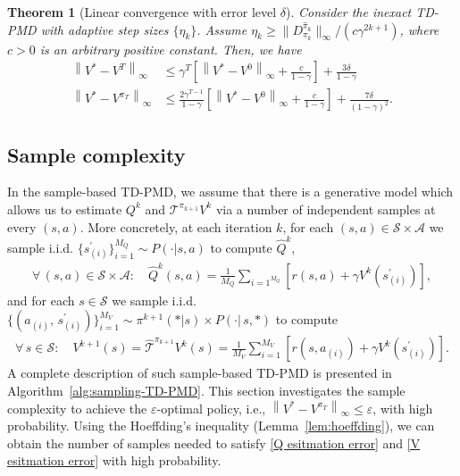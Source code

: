 \documentclass[10pt]{article}
\newcommand{\calA}{\mathcal{A}}
\newcommand{\calS}{\mathcal{S}}
\newcommand{\calT}{\mathcal{T}}
\newcommand{\ls}{\left}
\newcommand{\rs}{\right}
\theoremstyle{plain}
\newtheorem{theorem}{Theorem}[section]
\theoremstyle{definition}
\begin{document}
\begin{theorem}[Linear convergence with error level $\delta$]
    Consider the inexact TD-PMD  with adaptive step sizes $\{\eta_k\}$. Assume $\eta_k \geq {\| {D}_{\pi_k}^{\widehat{\pi}_k} \|_\infty}/{(c \gamma^{2k+1})}$, where $c > 0$ is an arbitrary positive constant. Then, we have
    \begin{align*}
        \ls\| V^* - V^T \rs\|_\infty &\leq \gamma^T \ls[ \ls\| V^* - V^0 \rs\|_\infty + \frac{c}{1-\gamma} \rs] + \frac{3\delta}{1-\gamma} \\
        \ls\| V^* - V^{\pi_T} \rs\|_\infty &\leq \frac{2\gamma^{T-1}}{1-\gamma} \ls[ \ls\| V^* - V^0 \rs\|_\infty + \frac{c}{1-\gamma} \rs] + \frac{7\delta}{(1-\gamma)^2}.
    \end{align*}
    \label{thm:linear-convergence-of-exact-TD-PMD-inexact}
\end{theorem}

\subsection{Sample complexity}
In the sample-based TD-PMD, we assume that there is a generative model which allows us to estimate $Q^k$ and $\mathcal{T}^{\pi_{k+1}}V^k$ via a number of independent samples at every $(s,a)$. More concretely, at each iteration $k$, for each $(s,a) \in \calS\times\calA$ we sample i.i.d. $\{ s^\prime_{(i)} \}_{i=1}^{M_Q} \sim P(\cdot|s,a)$ to compute $\hat{Q}^k$,
\begin{align*}
    \forall\, (s,a) \in \calS\times\calA: \quad \hat{Q}^k(s,a) = \frac{1}{M_Q} \sum\nolimits_{i=1}\nolimits^{M_Q} \ls[ r(s,a) + \gamma V^k(s^\prime_{(i)}) \rs],
\end{align*}
and for each $s\in\calS$ we sample i.i.d. $\{ (a_{(i)}, \, s^\prime_{(i)}) \}_{i=1}^{M_V} \sim \pi^{k+1}(*|s) \times P(\cdot|\,s,*)$ to compute
\begin{align*}
   \forall\, s\in\calS: \quad V^{k+1}(s) = \widehat{\calT}^{\pi_{k+1}} V^k(s) = \frac{1}{M_V} \sum\nolimits_{i=1}^{M_V} \ls[ r(s,a_{(i)}) + \gamma V^k(s^\prime_{(i)}) \rs].
\end{align*}
A complete description of such sample-based TD-PMD is presented in Algorithm~\ref{alg:sampling-TD-PMD}. This section investigates the sample complexity to achieve the $\varepsilon$-optimal policy, i.e., $
\left\| V^*-V^{\pi _T} \right\| _{\infty}\le \varepsilon$, with high probability. Using the Hoeffding’s inequality (Lemma~\ref{lem:hoeffding}), we can obtain the number of samples needed to satisfy \eqref{Q esitmation error} and \eqref{V esitmation error} with high probability.
\end{document}
